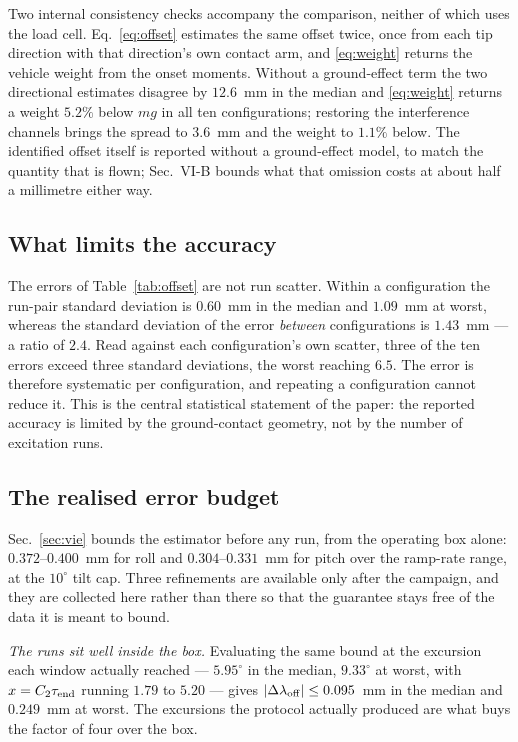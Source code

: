 Two internal consistency checks accompany the comparison, neither of
which uses the load cell. Eq.~\eqref{eq:offset} estimates the same
offset twice, once from each tip direction with that direction's own
contact arm, and \eqref{eq:weight} returns the vehicle weight from the
onset moments. Without a ground-effect term the two directional
estimates disagree by $12.6$~mm in the median and \eqref{eq:weight}
returns a weight $5.2\%$ below $mg$ in all ten configurations;
restoring the interference channels brings the spread to $3.6$~mm and
the weight to $1.1\%$ below. The identified offset itself is reported
without a ground-effect model, to match the quantity that is flown;
Sec.~VI-B bounds what that omission costs at about half a millimetre
either way.

\subsection{What limits the accuracy}

The errors of Table~\ref{tab:offset} are not run scatter. Within a
configuration the run-pair standard deviation is $0.60$~mm in the
median and $1.09$~mm at worst, whereas the standard deviation of the
error \emph{between} configurations is $1.43$~mm --- a ratio of
$2.4$. Read against each configuration's own scatter, three of the ten
errors exceed three standard deviations, the worst reaching $6.5$.
The error is therefore systematic per configuration, and repeating a
configuration cannot reduce it. This is the central statistical
statement of the paper: the reported accuracy is limited by the
ground-contact geometry, not by the number of excitation runs.

\subsection{The realised error budget}
\label{sec:realised}

Sec.~\ref{sec:vie} bounds the estimator before any run, from the
operating box alone: $0.372$--$0.400$~mm for roll and
$0.304$--$0.331$~mm for pitch over the ramp-rate range, at the
$10^\circ$ tilt cap. Three refinements are available only after the
campaign, and they are collected here rather than there so that the
guarantee stays free of the data it is meant to bound.

\emph{The runs sit well inside the box.} Evaluating the same bound at
the excursion each window actually reached --- $5.95^\circ$ in the
median, $9.33^\circ$ at worst, with $x = C_2\tau_{\rm end}$ running
$1.79$ to $5.20$ --- gives $|\Delta\lambda_{\rm off}| \le 0.095$~mm in
the median and $0.249$~mm at worst. The excursions the protocol
actually produced are what buys the factor of four over the box.

